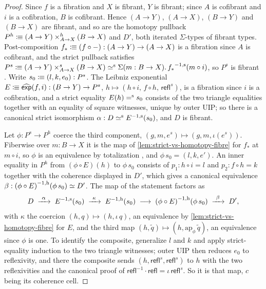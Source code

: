 \begin{proof}
	Since $f$ is a fibration and $X$ is fibrant, $Y$ is fibrant; since $A$ is cofibrant and $i$ is a cofibration, $B$ is cofibrant.
	Hence $(A \to Y)$, $(A \to X)$, $(B \to Y)$ and $(B \to X)$ are fibrant, and so are the homotopy pullback $P^h \mathrel{\vcentcolon\mspace{-1mu}\equiv} (A \to Y) \times^h_{A \to X} (B \to X)$ and $D'$, both iterated $\Sigma$-types of fibrant types.
	Post-composition $f_* \mathrel{\vcentcolon\mspace{-1mu}\equiv} (f \circ {-}) : (A \to Y) \to (A \to X)$ is a fibration since $A$ is cofibrant, and the strict pullback satisfies $P^s \mathrel{\vcentcolon\mspace{-1mu}\equiv} (A \to Y) \times^s_{A \to X} (B \to X) \mathrel{\simeq^\textup{s}} \Sigma(m : B \to X).\, {f_*}^{-1, \textup{s}}(m \circ i)$, so $P^s$ is fibrant \citep[Lem.~3.9]{2LTT}.
	Write $s_0 \mathrel{\vcentcolon\mspace{-1mu}\equiv} (l,k,e_0) : P^s$.
	The Leibniz exponential $E \mathrel{\vcentcolon\mspace{-1mu}\equiv} \widehat{\mathsf{exp}}(f,i) : (B \to Y) \to P^s$, $h \mapsto (h \circ i,\, f \circ h,\, \mathsf{refl}^s)$, is a fibration since $i$ is a cofibration, and a strict equality $E(h) \mathrel{=^\textup{s}} s_0$ consists of the two triangle equalities together with an equality of square witnesses, unique by outer UIP; so there is a canonical strict isomorphism $\alpha : D \mathrel{\simeq^\textup{s}} {E}^{-1, \textup{s}}(s_0)$, and $D$ is fibrant.

	Let $\phi : P^s \to P^h$ coerce the third component, $(g,m,e^s) \mapsto (g,m,\iota(e^s))$.
	Fiberwise over $m : B \to X$ it is the map of \cref{lem:strict-vs-homotopy-fibre} for $f_*$ at $m \circ i$, so $\phi$ is an equivalence by totalization \citep[Thm.~4.7.7]{HoTTBook}, and $\phi\,s_0 = (l,k,e')$.
	An inner equality in $P^h$ from $(\phi \circ E)(h)$ to $\phi\,s_0$ consists of $p_1 : h \circ i = l$ and $p_2 : f \circ h = k$ together with the coherence displayed in $D'$, which gives a canonical equivalence $\beta : {(\phi \circ E)}^{-1, \textup{h}}(\phi\,s_0) \simeq D'$.
	The map of the statement factors as
	\[
		D \;\xrightarrow{\ \alpha\ }\; \sfib{E}(s_0)
		  \;\xrightarrow{\ \kappa\ }\; \hfib{E}(s_0)
		  \;\longrightarrow\; \hfib{(\phi \circ E)}(\phi\,s_0)
		  \;\xrightarrow{\ \beta\ }\; D',
	\]
	with $\kappa$ the coercion $(h,q) \mapsto (h,\iota\,q)$, an equivalence by \cref{lem:strict-vs-homotopy-fibre} for $E$, and the third map $(h,\tilde q) \mapsto (h,\mathrm{ap}_\phi\,\tilde q)$, an equivalence since $\phi$ is one.
	To identify the composite, generalize $l$ and $k$ and apply strict-equality induction to the two triangle witnesses; outer UIP then reduces $e_0$ to reflexivity, and there the composite sends $(h,\mathsf{refl}^s,\mathsf{refl}^s)$ to $h$ with the two reflexivities and the canonical proof of $\mathsf{refl}^{-1}\cdot\mathsf{refl} = \iota\,\mathsf{refl}^s$. So it is that map, $c$ being its coherence cell.
\end{proof}


